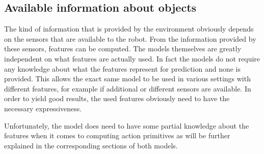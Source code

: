 %

\subsection{Available information about objects}

The kind of information that is provided by the environment obviously depends on the sensors that are available to the robot. From the information provided by these sensors, features can be computed. The models themselves are greatly independent on what features are actually used. In fact the models do not require any knowledge about what the features represent for prediction and none is provided. This allows the exact same model to be used in various settings with different features, for example if additional or different sensors are available. In order to yield good results, the used features obviously need to have the necessary expressiveness.

Unfortunately, the model does need to have some partial knowledge about the features when it comes to computing action primitives as will be further explained in the corresponding sections of both models.

